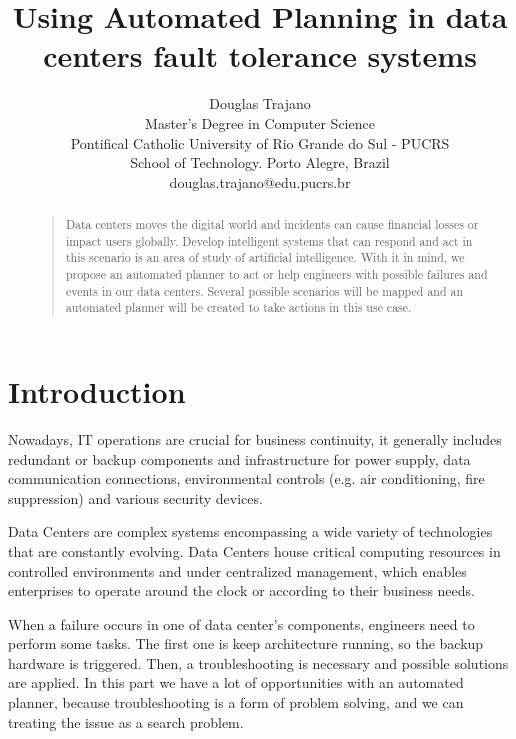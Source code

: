 \documentclass[letterpaper]{article}
\begin{document}
%
\title{Using Automated Planning in data centers fault tolerance systems}
\author{Douglas Trajano\\
Master's Degree in Computer Science\\
Pontifical Catholic University of Rio Grande do Sul - PUCRS\\
School of Technology. Porto Alegre, Brazil\\
douglas.trajano@edu.pucrs.br
}

\maketitle
\begin{abstract}
\begin{quote}
Data centers moves the digital world and incidents can cause financial losses or impact users globally. Develop intelligent systems that can respond and act in this scenario is an area of study of artificial intelligence. With it in mind, we propose an automated planner to act or help engineers with possible failures and events in our data centers. Several possible scenarios will be mapped and an automated planner will be created to take actions in this use case.
\end{quote}
\end{abstract}

\section{Introduction}
Nowadays, IT operations are crucial for business continuity, it generally includes redundant or backup components and infrastructure for power supply, data communication connections, environmental controls (e.g. air conditioning, fire suppression) and various security devices.

Data Centers are complex systems encompassing a wide variety of technologies that are constantly evolving. Data Centers house critical computing resources in controlled environments and under centralized management, which enables enterprises to operate around the clock or according to their business needs. \cite{book-dc-fundamentals}

When a failure occurs in one of data center's components, engineers need to perform some tasks. The first one is keep architecture running, so the backup hardware is triggered. Then, a troubleshooting is necessary and possible solutions are applied. In this part we have a lot of opportunities with an automated planner, because troubleshooting is a form of problem solving, and we can treating the issue as a search problem.
\end{document}
